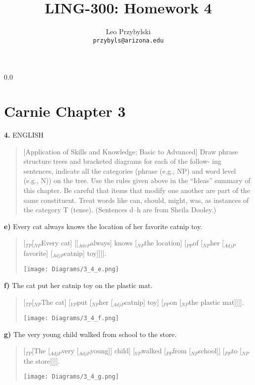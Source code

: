 \documentclass[11pt,notitlepage]{article}
\title{LING-300: Homework 4}
\author{Leo Przybylski\\
\texttt{przybyls@arizona.edu}}
\newcommand{\question}[2]{\textbf{#1.} #2}
\newcommand{\subquestion}[2]{\par\hspace{0.5cm} \textbf{#1)} #2}
\begin{document}
  \maketitle
  {\setlength{\baselineskip}%
           {0.0\baselineskip}
  \section*{Carnie Chapter 3}
  \hrulefill \par}
\question{4}{ENGLISH}
\begin{quote}
[Application of Skills and Knowledge; Basic to Advanced]
Draw phrase structure trees and bracketed diagrams for each of the
follow- ing sentences, indicate all the categories (phrase (e.g., NP)
and word level (e.g., N)) on the tree. Use the rules given above in
the “Ideas” summary of this chapter. Be careful that items that modify
one another are part of the same constituent. Treat words like can,
should, might, was, as instances of the category T (tense). (Sentences
d–h are from Sheila Dooley.)
\end{quote}

\subquestion{e}{Every cat always knows the location of her favorite catnip toy.}

\begin{quote}
[$_{TP}$[$_{NP}$Every cat] [[$_{AdvP}$always] knows [$_{NP}$the location] [$_{PP}$of [$_{NP}$her [$_{AdjP}$favorite] [$_{AdjP}$catnip] toy]]]].

\texttt{[image: Diagrams/3\_4\_e.png]}
\end{quote}

\subquestion{f}{The cat put her catnip toy on the plastic mat.}

\begin{quote}
[$_{TP}$[$_{NP}$The cat] [$_{VP}$put [$_{NP}$her [$_{AdjP}$catnip] toy] [$_{PP}$on [$_{NP}$the plastic mat]]]].

\texttt{[image: Diagrams/3\_4\_f.png]}
\end{quote}

\subquestion{g}{The very young child walked from school to the store.}

\begin{quote}
[$_{TP}$[The [$_{AdjP}$very [$_{AdjP}$young]] child] [$_{VP}$walked [$_{PP}$from [$_{NP}$school]] [$_{PP}$to [$_{NP}$the store]]]].

\texttt{[image: Diagrams/3\_4\_g.png]}
\end{quote}
\end{document}
